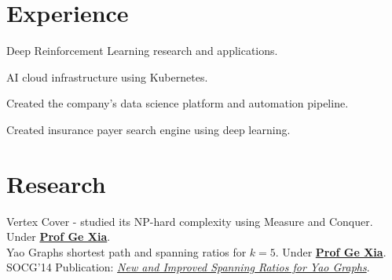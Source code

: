 \documentclass{deedy-resume-openfont}
\begin{document}
\hfill
\begin{minipage}[t]{0.66\textwidth}


\section{Experience}
\vspace{\topsep} %
\begin{tightemize}
\item Deep Reinforcement Learning research and applications.
\item AI cloud infrastructure using Kubernetes.
\end{tightemize}
\sectionsep

\begin{tightemize}
\item Created the company's data science platform and automation pipeline.
\item Created insurance payer search engine using deep learning.
\end{tightemize}
\sectionsep




\section{Research}
Vertex Cover - studied its NP-hard complexity using Measure and Conquer. Under \textbf{\href{http://www.cs.lafayette.edu/~gexia/}{Prof Ge Xia}}. \\
\sectionsep
{}
Yao Graphs shortest path and spanning ratios for $k=5$. Under \textbf{\href{http://www.cs.lafayette.edu/~gexia/}{Prof Ge Xia}}. SOCG'14 Publication: \textit{\href{https://arxiv.org/abs/1307.5829}{New and Improved Spanning Ratios for Yao Graphs}}.
\sectionsep


\end{minipage}
\end{document}
